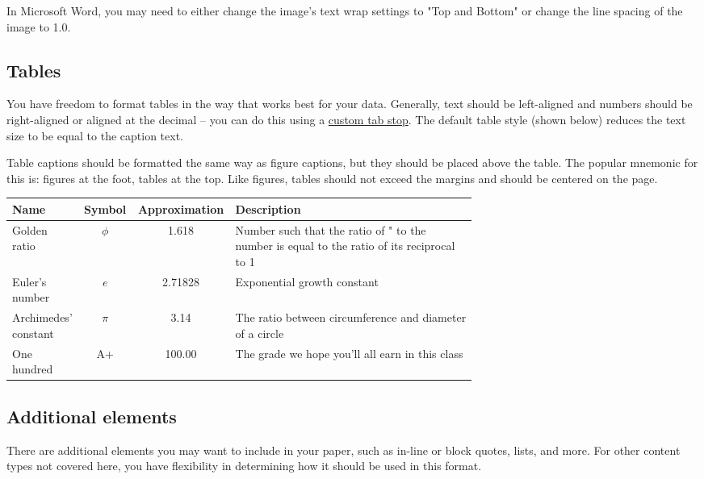 \documentclass[
	letterpaper, %
]{jdf}
\begin{document}
In Microsoft Word, you may need to either change the image’s text wrap settings to "Top and Bottom" or change the line spacing of the image to 1.0.

\subsection{Tables}
You have freedom to format tables in the way that works best for your data. Generally, text should be left-aligned and numbers should be right-aligned or aligned at the decimal – you can do this using a \href{https://practicaltypography.com/tabs-and-tab-stops.html}{custom tab stop}. The default table style (shown below) reduces the text size to be equal to the caption text.

Table captions should be formatted the same way as figure captions, but they should be placed above the table. The popular mnemonic for this is: figures at the foot, tables at the top. Like figures, tables should not exceed the margins and should be centered on the page.

\begin{jdftable}
\label{table:Example}
\small %
\begin{tabular}{@{} L{0.15\linewidth} c S L{0.52\linewidth}}
	\textbf{Name} & \textbf{Symbol} & \textbf{Approximation} & \textbf{Description} \\
	\toprule[0.5pt]
	Golden ratio & $\phi$ & 1.618 & Number such that the ratio of " to the number is equal to the ratio of its reciprocal to 1\\
	\midrule
	Euler's number & $e$ & 2.71828 & Exponential growth constant\\
	\midrule
	Archimedes' constant & $\pi$ & 3.14 & The ratio between circumference and diameter of a circle\\
	\midrule
	One hundred & A+ & 100.00 & The grade we hope you’ll all earn in this class\\
\end{tabular}
\end{jdftable}

\subsection{Additional elements}
There are additional elements you may want to include in your paper, such as in-line or block quotes, lists, and more. For other content types not covered here, you have flexibility in determining how it should be used in this format.
\end{document}
